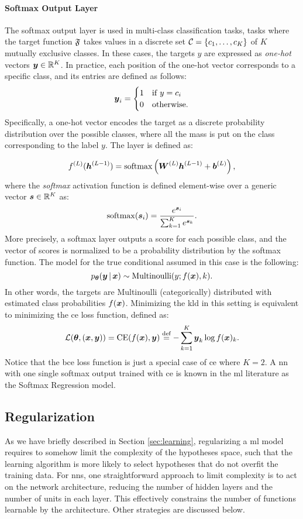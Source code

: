 \paragraph{Softmax Output Layer}
The softmax output layer is used in multi-class classification tasks, \ie tasks where the target function $\mathfrak{F}$ takes values in a discrete set $\Cal{C} = \Set{c_1, \ldots, c_K}$ of $K$ mutually exclusive classes. In these cases, the targets $y$ are expressed as \emph{one-hot} vectors $\Vector{y} \in \Real^K$. In practice, each position of the one-hot vector corresponds to a specific class, and its entries are defined as follows:
\begin{align*}
    \Vector{y}_i=
    \begin{cases}
        1 & \mathrm{if}\; y = c_i\\
        0 & \mathrm{otherwise}.
    \end{cases}
\end{align*}
Specifically, a one-hot vector encodes the target as a discrete probability distribution over the possible classes, where all the mass is put on the class corresponding to the label $y$. The layer is defined as:

$$\Layer{f}{L}(\LayerVector{h}{L-1}) = \softmax \Par{\LayerMatrix{W}{L} \LayerVector{h}{L-1} + \LayerVector{b}{L}},$$
where the \emph{softmax} activation function is defined element-wise over a generic vector $\Vector{s} \in \Real^K$ as:
$$\softmax(\Vector{s}_i) = \frac{e^{\Vector{s}_i}}{\sum_{k=1}^K e^{\Vector{s}_k}}.$$
More precisely, a softmax layer outputs a score for each possible class, and the vector of scores is normalized to be a probability distribution by the softmax function. The model for the true conditional assumed in this case is the following:
$$p_{\Param}(\Vector{y} \given \Vector{x}) \sim \Fun{Multinoulli}(y; f(\Vector{x}), k).$$
In other words, the targets are Multinoulli (categorically) distributed with estimated class probabilities $f(\Vector{x})$. Minimizing the \gls{kld} in this setting is equivalent to minimizing the \gls{ce} loss function, defined as:
$$\Loss(\Param, (\Vector{x}, \Vector{y})) = \mathrm{CE}(f(\Vector{x}), \Vector{y}) \defeq - \sum_{k=1}^K \Vector{y}_k \log f(\Vector{x})_k.$$
Notice that the \gls{bce} loss function is just a special case of \gls{ce} where $K = 2$. A \gls{nn} with one single softmax output trained with \gls{ce} is known in the \gls{ml} literature as the Softmax Regression model.

\subsection{Regularization}\label{sec:regularization}
As we have briefly described in Section \ref{sec:learning}, regularizing a \gls{ml} model requires to somehow limit the complexity of the hypotheses space, such that the learning algorithm is more likely to select hypotheses that do not overfit the training data. For \glspl{nn}, one straightforward approach to limit complexity is to act on the network architecture, reducing the number of hidden layers and the number of units in each layer. This effectively constrains the number of functions learnable by the architecture. Other strategies are discussed below.

